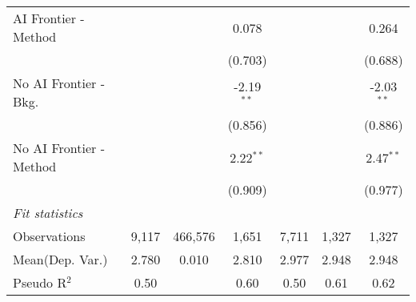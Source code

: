 \begin{tabular}{lcccccc}
   AI Frontier - Method    &              &         & 0.078        &              &             & 0.264\\   
                           &              &         & (0.703)      &              &             & (0.688)\\   
   No AI Frontier - Bkg.   &              &         & -2.19$^{**}$ &              &             & -2.03$^{**}$\\   
                           &              &         & (0.856)      &              &             & (0.886)\\   
   No AI Frontier - Method &              &         & 2.22$^{**}$  &              &             & 2.47$^{**}$\\   
                           &              &         & (0.909)      &              &             & (0.977)\\   
   \midrule
   \emph{Fit statistics}\\
   Observations            & 9,117        & 466,576 & 1,651        & 7,711        & 1,327       & 1,327\\  
Mean(Dep. Var.) & 2.780 & 0.010 & 2.810 & 2.977 & 2.948 & 2.948 \\
   Pseudo R$^2$            & 0.50         &         & 0.60         & 0.50         & 0.61        & 0.62\\  
   

\end{tabular}
